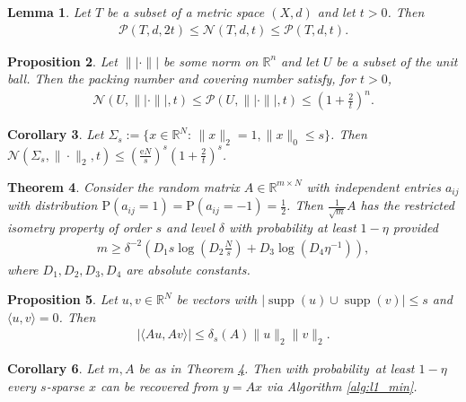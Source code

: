\documentclass[13pt]{article}
\newtheorem{thm}{Theorem}[section]
\newtheorem{lem}[thm]{Lemma}
\newtheorem{prop}[thm]{Proposition}
\newtheorem{cor}[thm]{Corollary}
\theoremstyle{plain}
\newcommand{\R}{\mathbb{R}}
\newcommand{\e}{\mathrm{e}}
\renewcommand{\P}{\bm{\mathrm{P}}}
\newcommand{\NN}{\mathcal{N}}
\newcommand{\PP}{\mathcal{P}}
\newcommand{\set}[1]{{\{#1\}}}
\DeclareMathOperator{\supp}{supp}
\begin{document}
\begin{lem}
    Let $T$ be a subset of a metric space $(X,d)$ and let $t > 0$. Then
    \[
        \begin{aligned}
            \PP(T,d,2t) \le \NN(T,d,t) \le \PP(T,d,t).
        \end{aligned}
    \]
\end{lem}

\begin{prop}
    Let $\| |\cdot\| |$ be some norm on $\R^n$ and let $U$ be a subset of the unit ball.
    Then the packing number and covering number satisfy, for $t > 0$,
    \[
        \begin{aligned}
            \NN(U, \| |\cdot\| |,t) \le \PP(U, \| |\cdot\| |,t) \le (1+\frac{2}{t})^n.
        \end{aligned}
    \]
\end{prop}

\begin{cor}
    Let $\Sigma_s := \set{x \in \R^N :\, \|x\|_2 = 1, \|x\|_0 \le s}$.
    Then $\NN(\Sigma_s,\|\cdot\|_2,t) \le \left( \frac{\e N}{s} \right)^s \left( 1 +\frac{2}{t} \right)^s$.
\end{cor}

\begin{thm} \label{thm:binrip}
    Consider the random matrix $A \in \R^{m \times N}$ with independent entries
    $a_{ij}$ with distribution $\P(a_{ij} = 1) = \P(a_{ij} = -1) = \frac{1}{2}$.
    Then $\frac{1}{\sqrt{m}}A$ has the restricted isometry property of order $s$ and level
    $\delta$ with probability at least $1 - \eta$ provided
    \[
        \begin{aligned}
            m \ge \delta^{-2} \left( D_1s\log\left( D_2 \frac{N}{s} \right) + D_3\log(D_4\eta^{-1}) \right),
        \end{aligned}
    \]
    where $D_1,D_2,D_3,D_4$ are absolute constants.
\end{thm}

\begin{prop}
    Let $u,v \in \R^N$ be vectors with $|\supp(u) \cup \supp(v)| \le s$ and $\langle u,v \rangle = 0$.
    Then
    \[
        \begin{aligned}
            |\langle Au, Av \rangle| \le \delta_s(A) \|u\|_2\|v\|_2.
        \end{aligned}
    \]
\end{prop}

\begin{cor}
    Let $m, A$ be as in Theorem \ref{thm:binrip}. Then with probability at least
    $1 - \eta$ every $s$-sparse $x$ can be recovered from $y = Ax$ via Algorithm \ref{alg:l1_min}.
\end{cor}
\end{document}
